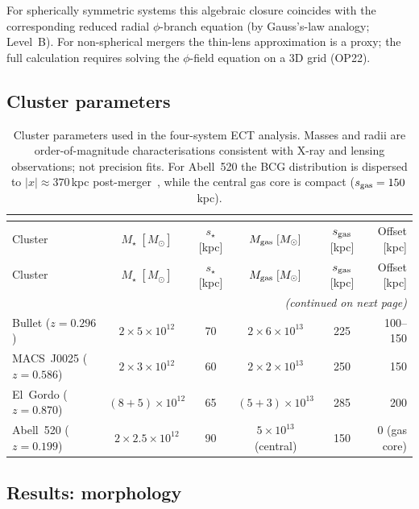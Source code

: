 \documentclass[11pt,a4paper]{article}
\numberwithin{equation}{section}
\begin{document}
For spherically symmetric systems this algebraic closure coincides
with the corresponding reduced radial $\phi$-branch equation
(by Gauss's-law analogy; Level~B).
For non-spherical mergers the thin-lens approximation is a proxy;
the full calculation requires solving the $\phi$-field equation on
a 3D grid (OP22).

\subsection{Cluster parameters}
\label{app:cluster_params}

\begin{longtable}{lccccr}
\caption{Cluster parameters used in the four-system ECT analysis.
Masses and radii are order-of-magnitude characterisations consistent
with X-ray and lensing observations; not precision fits.
For Abell~520 the BCG distribution is dispersed to
$|x|\approx370\,$kpc post-merger~\cite{Mahdavi2007}, while the
central gas core is compact ($s_{\rm gas}=150\,$kpc).} \\
\label{tab:cluster_params} \\[-6pt]
\toprule

Cluster & $M_\star\;[M_\odot]$ & $s_\star$ [kpc] &
  $M_{\rm gas}\;[M_\odot]$ & $s_{\rm gas}$ [kpc] &
  Offset [kpc] \\
\midrule
\endfirsthead
\toprule

Cluster & $M_\star\;[M_\odot]$ & $s_\star$ [kpc] &
  $M_{\rm gas}\;[M_\odot]$ & $s_{\rm gas}$ [kpc] &
  Offset [kpc] \\
\midrule
\endhead
\midrule\multicolumn{6}{r}{\small\textit{(continued on next page)}}\\
\endfoot
\bottomrule
\endlastfoot
Bullet ($z=0.296$) &
  $2\times5\times10^{12}$ & 70 &
  $2\times6\times10^{13}$ & 225 & 100--150 \\
MACS~J0025 ($z=0.586$) &
  $2\times3\times10^{12}$ & 60 &
  $2\times2\times10^{13}$ & 250 & 150 \\
El~Gordo ($z=0.870$) &
  $(8{+}5)\times10^{12}$ & 65 &
  $(5{+}3)\times10^{13}$ & 285 & 200 \\
Abell~520 ($z=0.199$) &
  $2\times2.5\times10^{12}$ & 90 &
  $5\times10^{13}$ (central) & 150 & 0 (gas core) \\

\end{longtable}

\subsection{Results: morphology}
\label{app:cluster_morph}
\end{document}
